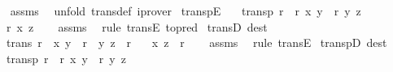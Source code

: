 \begin{isabellebody}
%
\isadelimproof
\ \ %
\endisadelimproof
%
\isatagproof
{}\isamarkupfalse%
\ assms\ \isamarkupfalse%
\ {\isacharparenleft}{\kern0pt}unfold\ trans{\isacharunderscore}{\kern0pt}def{\isacharparenright}{\kern0pt}\ iprover%
\endisatagproof
{\isafoldproof}%
%
\isadelimproof
\isanewline
%
\endisadelimproof
\isanewline
{}\isamarkupfalse%
\ transpE{\isacharcolon}{\kern0pt}\isanewline
\ \ \ {\isachardoublequoteopen}transp\ r{\isachardoublequoteclose}\ \ {\isachardoublequoteopen}r\ x\ y{\isachardoublequoteclose}\ \ {\isachardoublequoteopen}r\ y\ z{\isachardoublequoteclose}\isanewline
\ \ \ {\isachardoublequoteopen}r\ x\ z{\isachardoublequoteclose}\isanewline
%
\isadelimproof
\ \ %
\endisadelimproof
%
\isatagproof
{}\isamarkupfalse%
\ assms\ \isamarkupfalse%
\ {\isacharparenleft}{\kern0pt}rule\ transE\ {\isacharbrackleft}{\kern0pt}to{\isacharunderscore}{\kern0pt}pred{\isacharbrackright}{\kern0pt}{\isacharparenright}{\kern0pt}%
\endisatagproof
{\isafoldproof}%
%
\isadelimproof
\isanewline
%
\endisadelimproof
\isanewline
{}\isamarkupfalse%
\ transD\ {\isacharbrackleft}{\kern0pt}dest{\isacharquery}{\kern0pt}{\isacharbrackright}{\kern0pt}{\isacharcolon}{\kern0pt}\isanewline
\ \ \ {\isachardoublequoteopen}trans\ r{\isachardoublequoteclose}\ \ {\isachardoublequoteopen}{\isacharparenleft}{\kern0pt}x{\isacharcomma}{\kern0pt}\ y{\isacharparenright}{\kern0pt}\ {\isasymin}\ r{\isachardoublequoteclose}\ \ {\isachardoublequoteopen}{\isacharparenleft}{\kern0pt}y{\isacharcomma}{\kern0pt}\ z{\isacharparenright}{\kern0pt}\ {\isasymin}\ r{\isachardoublequoteclose}\isanewline
\ \ \ {\isachardoublequoteopen}{\isacharparenleft}{\kern0pt}x{\isacharcomma}{\kern0pt}\ z{\isacharparenright}{\kern0pt}\ {\isasymin}\ r{\isachardoublequoteclose}\isanewline
%
\isadelimproof
\ \ %
\endisadelimproof
%
\isatagproof
{}\isamarkupfalse%
\ assms\ \isamarkupfalse%
\ {\isacharparenleft}{\kern0pt}rule\ transE{\isacharparenright}{\kern0pt}%
\endisatagproof
{\isafoldproof}%
%
\isadelimproof
\isanewline
%
\endisadelimproof
\isanewline
{}\isamarkupfalse%
\ transpD\ {\isacharbrackleft}{\kern0pt}dest{\isacharquery}{\kern0pt}{\isacharbrackright}{\kern0pt}{\isacharcolon}{\kern0pt}\isanewline
\ \ \ {\isachardoublequoteopen}transp\ r{\isachardoublequoteclose}\ \ {\isachardoublequoteopen}r\ x\ y{\isachardoublequoteclose}\ \ {\isachardoublequoteopen}r\ y\ z{\isachardoublequoteclose}\isanewline

\end{isabellebody}
